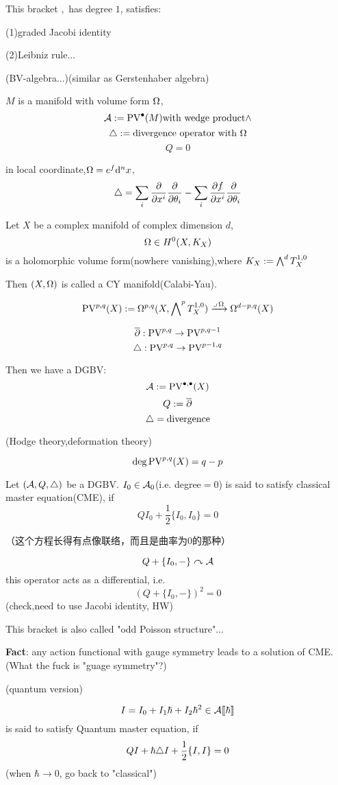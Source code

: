 This bracket ${,}$ has degree $1$, satisfies:

(1)graded Jacobi identity

(2)Leibniz rule...

(BV-algebra...)(similar as Gerstenhaber algebra)

\begin{example}
$M$ is a manifold with volume form $\Omega$,
$$\mathcal{A}:=\operatorname{PV}^{\bullet}(M)\text{with wedge product}\wedge$$
$$\triangle:=\text{divergence operator with $\Omega$}$$
$$Q=0$$

in local coordinate,$\Omega=e^f\mathrm{d}^nx$,
$$\triangle=\sum_i\frac{\partial } {\partial x^i}\frac{\partial } {\partial \theta_i}-\sum_i\frac{\partial f} {\partial x^i}\frac{\partial } {\partial \theta_i}$$
\end{example}

\begin{example}
Let $X$ be a complex manifold of complex dimension $d$,
$$\Omega\in H^0(X,K_X)$$
is a holomorphic volume form(nowhere vanishing),where
$K_X:=\bigwedge\nolimits^{d}T_X^{1,0}$

Then $(X,\Omega)$ is called a CY manifold(Calabi-Yau).

$$\operatorname{PV}^{p,q}(X):=\Omega^{p,q}(X,\bigwedge\nolimits^{p}T_X^{1,0})
\xrightarrow{\lrcorner\,\Omega}\Omega^{d-p,q}(X)$$

$$\overline{\partial}:\operatorname{PV}^{p,q}\to\operatorname{PV}^{p,q-1}$$
$$\triangle:\operatorname{PV}^{p,q}\to\operatorname{PV}^{p-1,q}$$
\end{example}
Then we have a DGBV:
$$\mathcal{A}:=\operatorname{PV}^{\bullet,\bullet}(X)$$
$$Q:=\overline{\partial}$$
$$\triangle=\text{divergence}$$

(Hodge theory,deformation theory)

$$\deg\operatorname{PV}^{p,q}(X)=q-p$$

\begin{definition}
Let $(\mathcal{A},Q,\triangle)$ be a DGBV. $I_0\in\mathcal{A}_0$(i.e. degree$=0$) is said to
satisfy classical master equation(CME), if
$$QI_0+\frac{1}{2}\{I_0,I_0\}=0$$
\end{definition}
（这个方程长得有点像联络，而且是曲率为0的那种）

$$Q+\{I_0,-\}\curvearrowright\mathcal{A}$$
this operator acts as a differential, i.e.
$$(Q+\{I_0,-\})^2=0$$
(check,need to use Jacobi identity, HW)

This bracket is also called "odd Poisson structure"...

\textbf{Fact}:
any action functional with gauge symmetry leads to a solution of CME.
(What the fuck is "guage symmetry"?)

(quantum version)

$$I=I_0+I_1\hbar+I_2\hbar^2\in\mathcal{A}[\![\hbar]\!]$$
is said to satisfy Quantum master equation, if
$$QI+\hbar\triangle I+\frac{1}{2}\{I,I\}=0$$
(when $\hbar\to 0$, go back to "classical")

